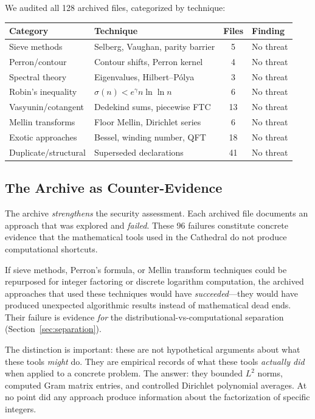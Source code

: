 \documentclass[11pt,a4paper]{article}
\begin{document}
We audited all 128 archived files, categorized by technique:

\begin{center}
\small
\begin{tabular}{@{}llcl@{}}
\toprule
\textbf{Category} & \textbf{Technique} & \textbf{Files} & \textbf{Finding} \\
\midrule
Sieve methods & Selberg, Vaughan, parity barrier & 5 & No threat \\
Perron/contour & Contour shifts, Perron kernel & 4 & No threat \\
Spectral theory & Eigenvalues, Hilbert--P\'olya & 3 & No threat \\
Robin's inequality & $\sigma(n) < e^\gamma n\ln\ln n$ & 6 & No threat \\
Vasyunin/cotangent & Dedekind sums, piecewise FTC & 13 & No threat \\
Mellin transforms & Floor Mellin, Dirichlet series & 6 & No threat \\
Exotic approaches & Bessel, winding number, QFT & 18 & No threat \\
Duplicate/structural & Superseded declarations & 41 & No threat \\
\bottomrule
\end{tabular}
\end{center}

\subsection{The Archive as Counter-Evidence}

The archive \emph{strengthens} the security assessment. Each archived
file documents an approach that was explored and \emph{failed}. These
96 failures constitute concrete evidence that the mathematical tools
used in the Cathedral do not produce computational shortcuts.

\begin{claim}
If sieve methods, Perron's formula, or Mellin transform techniques
could be repurposed for integer factoring or discrete logarithm
computation, the archived approaches that used these techniques
would have \emph{succeeded}---they would have produced unexpected
algorithmic results instead of mathematical dead ends. Their failure
is evidence \emph{for} the distributional-vs-computational separation
(Section~\ref{sec:separation}).
\end{claim}

The distinction is important: these are not hypothetical arguments
about what these tools \emph{might} do. They are empirical records
of what these tools \emph{actually did} when applied to a
concrete problem. The answer: they bounded $L^2$ norms, computed
Gram matrix entries, and controlled Dirichlet polynomial averages.
At no point did any approach produce information about the
factorization of specific integers.
\end{document}
